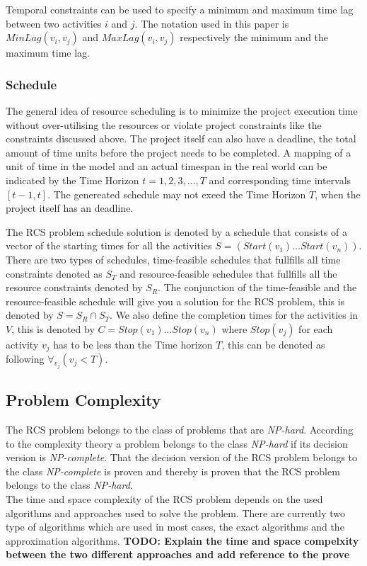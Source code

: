 \documentclass{article}
\newcommand{\TODO}[1]{{\color{red}\textbf{TODO: #1}}}
\begin{document}
Temporal constraints can be used to specify a minimum and maximum time lag between two activities $i$ and $j$. The notation used in this paper is $MinLag(v_i, v_j)$ and $MaxLag(v_i, v_j)$ respectively the minimum and the maximum time lag.

\subsubsection{Schedule}
The general idea of resource scheduling is to minimize the project execution time without over-utilising the resources or violate project constraints like the constraints discussed above. The project itself can also have a deadline, the total amount of time units before the project needs to be completed. A mapping of a unit of time in the model and an actual timespan in the real world can be indicated by the Time Horizon $t=1,2,3,\ldots,T$ and corresponding time intervals $[t-1,t]$. The genereated schedule may not exeed the Time Horizon $T$, when the project itself has an deadline.

The RCS problem schedule solution is denoted by a schedule that consists of a vector of the starting times for all the activities $S =  (Start(v_1) \ldots Start(v_n))$. There are two types of schedules, time-feasible schedules that fullfills all time constraints denoted as $S_T$ and resource-feasible schedules that fullfills all the resource constraints denoted by $S_R$. The conjunction of the time-feasible and the resource-feasible schedule will give you a solution for the RCS problem, this is denoted by $S = S_R \cap S_T$. We also define the completion times for the activities in $V$, this is denoted by $C = Stop(v_1) \ldots Stop(v_n)$ where $Stop(v_j)$ for each activity $v_j$ has to be less than the Time horizon $T$, this can be denoted as following $\forall_{v_j}(v_j < T)$.

\subsection{Problem Complexity}
The RCS problem belongs to the class of problems that are \emph{NP-hard}. According to the complexity theory a problem belongs to the class \emph{NP-hard} if its decision version is \emph{NP-complete}. That the decision version of the RCS problem belongs to the class \emph{NP-complete} is proven and thereby is proven that the RCS problem belongs to the class \emph{NP-hard}. \\
The time and space complexity of the RCS problem depends on the used algorithms and approaches used to solve the problem. There are currently two type of algorithms which are used in most cases, the exact algorithms and the approximation algorithms.
\TODO{Explain the time and space compelxity between the two different approaches and add reference to the prove}
\end{document}

